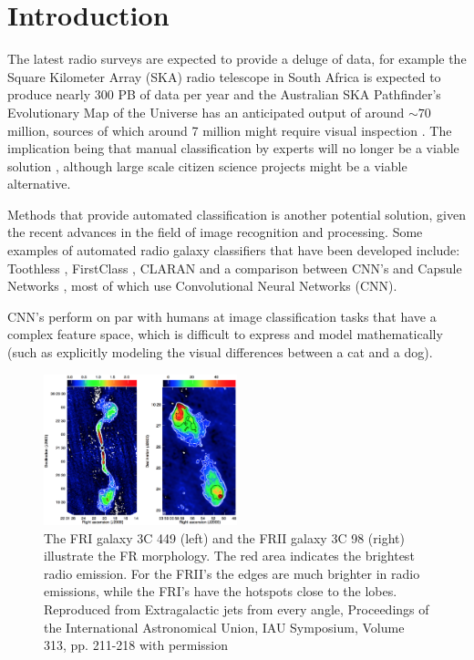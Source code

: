 \documentclass[conference]{IEEEtran}
\begin{document}
\section{Introduction}
The latest radio surveys are expected to provide a deluge of data, for example the Square Kilometer Array (SKA) radio telescope in South Africa is expected to produce nearly 300 PB of data per year \cite{jonas_2018} and the Australian SKA Pathfinder's Evolutionary Map of the Universe has an anticipated output of around $\sim70$ million, sources of which around 7 million might require visual inspection \cite{askap_2008} \cite{emu_2011}. The implication being that  manual classification by experts will no longer be a viable solution \cite{hocking_2015}, although large scale citizen science projects might be a viable alternative.

Methods that provide automated classification is another potential solution, given the recent advances in the field of image recognition and processing. Some examples of automated radio galaxy classifiers that have been developed include: Toothless \cite{aniyan_thorat_2017}, FirstClass \cite{alhassan_2018}, CLARAN \cite{wu_2019} and a comparison between CNN's and Capsule Networks \cite{lukic_2019}, most of which use Convolutional Neural Networks (CNN).

CNN's perform on par with humans at image classification tasks that have a complex feature space, which is difficult to express and model mathematically (such as explicitly modeling the visual differences between a cat and a dog). 


\begin{figure}[h]
    \centering
    \includegraphics[width=0.5\textwidth]{EPS/kharb2015.eps}
    \caption{The FRI galaxy 3C 449 (left) and the FRII galaxy 3C 98 (right) illustrate the FR morphology. The red area indicates the brightest radio emission. For the FRII's the edges are much brighter in radio emissions, while the FRI's have the hotspots close to the lobes. Reproduced from Extragalactic jets from every angle, Proceedings of the International Astronomical Union, IAU Symposium, Volume 313, pp. 211-218 with permission \cite{kharb2015}}
    \label{fig:kharb}
\end{figure}
\end{document}
